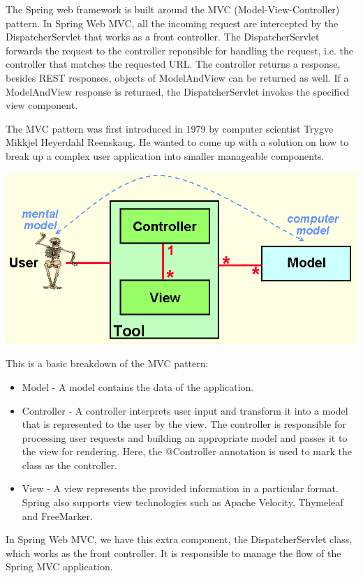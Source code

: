 The Spring web framework is built around the MVC (Model-View-Controller) pattern.
In Spring Web MVC,  all the incoming request are intercepted by the DispatcherServlet that works as a front controller. The DispatcherServlet forwards the request to the controller reponsible for handling the request, i.e. the controller that matches the requested URL.   The controller returns a response, besides REST responses, objects of ModelAndView can be returned as well.  If a ModelAndView response is returned, the  DispatcherServlet invokes the specified view component.

The MVC pattern was first introduced in 1979 by computer scientist Trygve Mikkjel Heyerdahl Reenskaug. He wanted to come up with a solution on how to break up a complex user application into smaller manageable components.

\includegraphics[width=\textwidth]{./images/chapter8/original_mvc}

This is a basic breakdown of the MVC pattern:

\begin{itemize}
\item Model - A model contains the data of the application.  
\item Controller - A controller interprets user input and transform it into a model that is represented to the user by the view.  The controller is responsible for processing user requests and building an appropriate model and passes it to the view for rendering. Here, the @Controller annotation is used to mark the class as the controller.
\item View - A view represents the provided information in a particular format.  Spring also supports view technologies such as Apache Velocity,  Thymeleaf and FreeMarker.
\end{itemize}

In Spring Web MVC,  we have this extra component, the DispatcherServlet class, which works as the front controller. It is responsible to manage the flow of the Spring MVC application.


